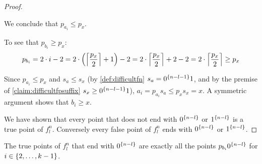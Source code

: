 \begin{proof}
\begin{itemize}
We conclude that $p_{a_i} \leq p_x$.

To see that $p_{b_i} \geq p_x$:
$$
p_{b_i}
= 2 \cdot i - 2
= 2 \cdot \round*{\ceil*{\frac{p_x}{2}} + 1} - 2
= 2 \cdot \ceil*{\frac{p_x}{2}} + 2 - 2
= 2 \cdot \ceil*{\frac{p_x}{2}}
\geq p_x
$$

Since $p_{a_i} \leq p_x$ and $s_a \leq s_x$
(by \cref{def:difficultfn}
$s_a = \rep{0}{n-l-1} 1$,
and by the premise of \cref{claim:difficultfpsuffix}
$s_x \geq \rep{0}{n-l-1} 1$),
$a_i = p_{a_i} s_a \leq p_x s_x = x$.
A symmetric argument shows that $b_i \geq x$.
\end{itemize}

We have shown that every point that does not end with
$\rep{0}{n-l}$ or $\rep{1}{n-l}$
is a true point of $f_l^n$.
Conversely
every false point of $f_l^n$
ends with $\rep{0}{n-l}$ or $\rep{1}{n-l}$.
\end{proof}

\begin{observation}
\label{observation:difficulttpinb}
The true points of $f_l^n$
that end with $\rep{0}{n-l}$
are exactly all the points $p_{b_i} \rep{0}{n-l}$
for $i \in \curly{2, \ldots, k-1}$.
\end{observation}

